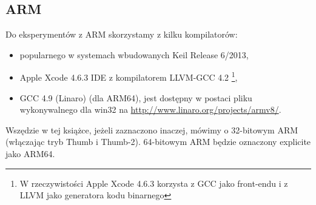 \subsection{ARM}
\label{sec:hw_ARM}

\myindex{\idevices}
Do eksperymentów z ARM skorzystamy z kilku kompilatorów:

\begin{itemize}
\item popularnego w systemach wbudowanych Keil Release 6/2013,

\item Apple Xcode 4.6.3 IDE z kompilatorem LLVM-GCC 4.2
\footnote{W rzeczywistości Apple Xcode 4.6.3 korzysta z GCC jako front-endu i z LLVM jako generatora kodu binarnego},

\item GCC 4.9 (Linaro) (dla ARM64), 
jest dostępny w postaci pliku wykonywalnego dla win32 na \url{http://www.linaro.org/projects/armv8/}.

\end{itemize}

Wszędzie w tej książce, jeżeli zaznaczono inaczej, mówimy o 32-bitowym ARM (włączając tryb Thumb i Thumb-2).
64-bitowym ARM będzie oznaczony explicite jako ARM64.








